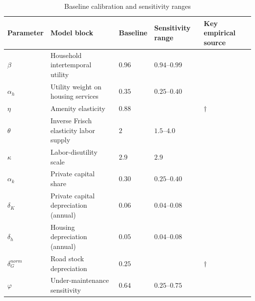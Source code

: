 \begin{table}[htbp]
\centering
\caption{Baseline calibration and sensitivity ranges}
\begin{tabularx}{\textwidth}{
  >{\raggedright\arraybackslash}p{2.2cm}   %
  >{\raggedright\arraybackslash}p{3.4cm}   %
  >{\centering\arraybackslash}p{2.2cm}     %
  >{\centering\arraybackslash}p{2.8cm}     %
  >{\raggedright\arraybackslash}p{3.8cm}   %
}
\toprule
\textbf{Parameter} & \textbf{Model block} & \textbf{Baseline} & \textbf{Sensitivity range} & \textbf{Key empirical source} \\ 
\midrule
$\beta$               & Household intertemporal utility             & $0.96$    & $0.94$–$0.99$          & \citet{cooley1995frontiers} \\ 
$\alpha_h$            & Utility weight on housing services                        & $0.35$                & $0.25$–$0.40$            & \citep{bls2023consumer} \\ 
$\eta$              & Amenity elasticity                & $0.88$                &             & $\dagger$ \\ 
$\theta$                & Inverse Frisch elasticity labor supply    & $2$                & $1.5$–$4.0$            & \citet{chetty2011micro} \\ 
$\kappa$              & Labor-disutility scale                 & $2.9$ & $2.9$        &  \cite{chatterjee2017optimal} \\ 
$\alpha_k$            & Private capital share                       & $0.30$                & $0.25$–$0.40$            & \citet{chatterjee2017optimal} \\ 
$\delta_{K}$          & Private capital depreciation (annual)       & $0.06$               & $0.04$–$0.08$            & \citet{cooley1995frontiers} \\ 
$\delta_{h}$          & Housing depreciation (annual)       & $0.05$               & $0.04$–$0.08$            &  \\ 
$\delta_{G}^{norm}$          & Road stock depreciation            & $0.25$               &           &  $\dagger$ \\ 
$\varphi$             & Under-maintenance sensitivity                      & $0.64$                & $0.25$–$0.75$            & \citet{rioja2003} \\ 

\end{tabularx}
\end{table}
